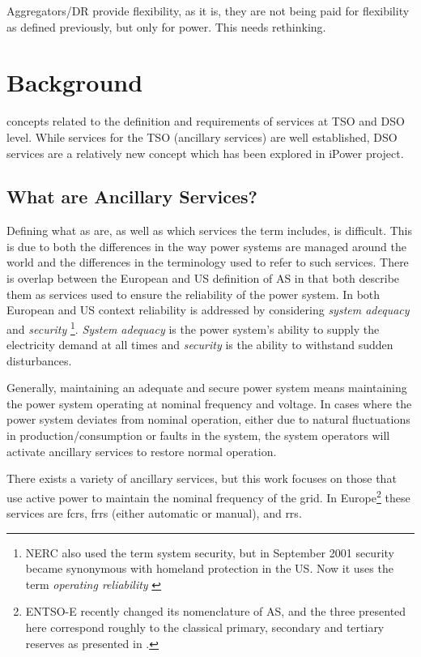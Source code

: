 Aggregators/DR provide flexibility, as it is, they are not being paid for flexibility as defined previously, but only for power. This needs rethinking.
\section{Background}\label{sec:backgroundservices} %
 concepts related to the definition and requirements of services at TSO and DSO level. While services for the TSO (ancillary services) are well established, DSO services are a relatively new concept which has been explored in iPower project.
\subsection{What are Ancillary Services?} %
\label{sub:ancillaryservicesdef}
Defining what \gls{as} are, as well as which services the term includes, is difficult. This is due to both the differences in the way power systems are managed around the world and the differences in the terminology used to refer to such services. There is overlap between the European and US definition of AS in that both describe them as services used to ensure the reliability of the power system. In both European and US context reliability is addressed by considering \emph{system adequacy} and \emph{security} \footnote{NERC also used the term system security, but in September 2001 security became synonymous with homeland protection in the US. Now it uses the term \emph{operating reliability} \cite{nerc2007definition}}. \emph{System adequacy} is the power system's ability to supply the electricity demand at all times and \emph{security} is the ability to withstand sudden disturbances.

Generally, maintaining an adequate and secure power system means maintaining the power system operating at nominal frequency and voltage. In cases where the power system deviates from nominal operation, either due to natural fluctuations in production/consumption or faults in the system, the system operators will activate ancillary services to restore normal operation. 

There exists a variety of ancillary services, but this work focuses on those that use active power to maintain the nominal frequency of the grid. In Europe\footnote{ENTSO-E recently changed its nomenclature of AS, and the three presented here correspond roughly to the classical primary, secondary and tertiary reserves as presented in \cite{Rebours}.} these services are \glspl{fcr}, \glspl{frr} (either automatic or manual), and \glspl{rr}.
